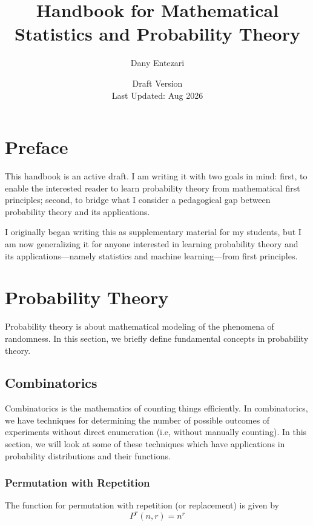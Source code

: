 \documentclass{article}
\title{Handbook for Mathematical Statistics and Probability Theory}
\author{Dany Entezari}
\date{Draft Version \\
Last Updated: Aug 2026}
\begin{document}
\maketitle
\tableofcontents

\newpage
\section{Preface}
This handbook is an active draft. I am writing it with two goals in mind: first, to enable the interested reader to learn probability theory from mathematical first principles; second, to bridge what I consider a pedagogical gap between probability theory and its applications.

I originally began writing this as supplementary material for my students, but I am now generalizing it for anyone interested in learning probability theory and its applications—namely statistics and machine learning—from first principles.

\newpage
\section{Probability Theory}
Probability theory is about mathematical modeling of the phenomena of randomness. In this section, we briefly define fundamental concepts in probability theory.

\subsection{Combinatorics}
Combinatorics is the mathematics of counting things efficiently. In combinatorics, we have techniques for determining the number of possible outcomes of experiments without direct enumeration (i.e, without manually counting). In this section, we will look at some of these techniques which have applications in probability distributions and their functions.

\subsubsection{Permutation with Repetition}
The function for permutation with repetition (or replacement) is given by
$$
P^{r}(n,r) = n^r
$$
\end{document}
